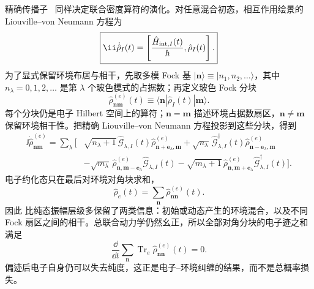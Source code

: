 精确传播子~ 同样决定联合密度算符的演化。对任意混合初态，相互作用绘景的 Liouville--von Neumann 方程为
\begin{equation}
\boxed{
\ii\dot{\hat\rho}_I(t)
=\left[\frac{\hat H_{{\rm int},I}(t)}{\hbar},\hat\rho_I(t)\right].}
\label{eq:general_multimode_von_neumann_equation}
\end{equation}
为了显式保留环境布居与相干，先取多模 Fock 基
$|\mathbf n\rangle\equiv|n_1,n_2,\ldots\rangle$，其中 $n_\lambda=0,1,2,\ldots$ 是第 $\lambda$ 个玻色模式的占据数；再定义玻色 Fock 分块
\[
\hat\rho^{(e)}_{\mathbf n\mathbf m}(t)
\equiv
\langle\mathbf n|\hat\rho_I(t)|\mathbf m\rangle .
\]
每个分块仍是电子 Hilbert 空间上的算符；$\mathbf n=\mathbf m$ 描述环境占据数扇区，$\mathbf n\ne\mathbf m$ 保留环境相干性。把精确 Liouville--von Neumann 方程投影到这些分块，得到
\begin{equation}
\boxed{
\begin{aligned}
\ii\dot\hat\rho^{(e)}_{\mathbf n\mathbf m}
=\sum_\lambda\Big[&
\sqrt{n_\lambda+1}\,\hat{\mathcal G}_{\lambda,I}(t)
\hat\rho^{(e)}_{\mathbf n+\mathbf e_\lambda,\mathbf m}
+\sqrt{n_\lambda}\,\hat{\mathcal G}_{\lambda,I}^\dagger(t)
\hat\rho^{(e)}_{\mathbf n-\mathbf e_\lambda,\mathbf m}\\
&-\sqrt{m_\lambda}\,
\hat\rho^{(e)}_{\mathbf n,\mathbf m-\mathbf e_\lambda}
\hat{\mathcal G}_{\lambda,I}(t)
-\sqrt{m_\lambda+1}\,
\hat\rho^{(e)}_{\mathbf n,\mathbf m+\mathbf e_\lambda}
\hat{\mathcal G}_{\lambda,I}^\dagger(t)
\Big].
\end{aligned}}
\label{eq:universal_multiboson_density_block_equation}
\end{equation}
电子约化态只在最后对环境对角块求和，
\[
\hat\rho_e(t)=\sum_{\mathbf n}\hat\rho^{(e)}_{\mathbf n\mathbf n}(t).
\]
因此 比纯态振幅层级多保留了两类信息：初始或动态产生的环境混合，以及不同 Fock 扇区之间的相干。总联合动力学仍然幺正，所以全部对角分块的电子迹之和满足
\begin{equation}
\boxed{
\frac{\dd}{\dd t}
\sum_{\mathbf n}\operatorname{Tr}_e
\hat\rho^{(e)}_{\mathbf n\mathbf n}(t)=0.}
\label{eq:universal_multiboson_trace_conservation}
\end{equation}
偏迹后电子自身仍可以失去纯度，这正是电子--环境纠缠的结果，而不是总概率损失。

